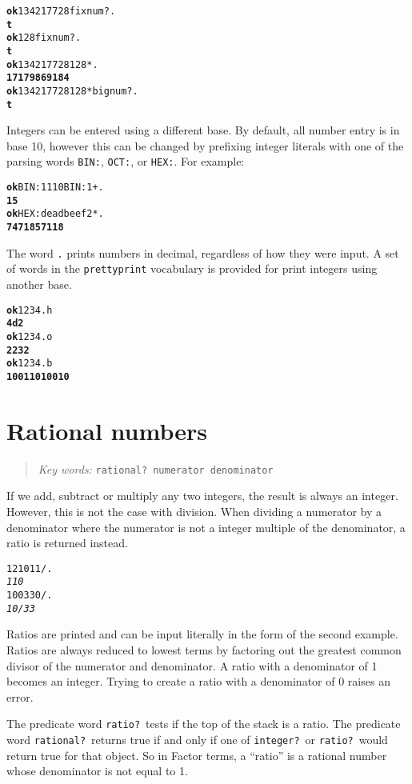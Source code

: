 \documentclass[english]{book}
\newcommand{\chapkeywords}[1]{%
\begin{quote}
\emph{Key words:} \texttt{#1}
\end{quote}
}
\begin{document}
\begin{alltt}
\textbf{ok} 134217728 fixnum? .
\textbf{t}
\textbf{ok} 128 fixnum? .
\textbf{t}
\textbf{ok} 134217728 128 * .
\textbf{17179869184}
\textbf{ok} 134217728 128 * bignum? .
\textbf{t}
\end{alltt}

Integers can be entered using a different base. By default, all number entry is in base 10, however this can be changed by prefixing integer literals with one of the parsing words \texttt{BIN:}, \texttt{OCT:}, or \texttt{HEX:}. For example:

\begin{alltt}
\textbf{ok} BIN: 1110 BIN: 1 + .
\textbf{15}
\textbf{ok} HEX: deadbeef 2 * .
\textbf{7471857118}
\end{alltt}

The word \texttt{.} prints numbers in decimal, regardless of how they were input. A set of words in the \texttt{prettyprint} vocabulary is provided for print integers using another base.

\begin{alltt}
\textbf{ok} 1234 .h
\textbf{4d2}
\textbf{ok} 1234 .o
\textbf{2232}
\textbf{ok} 1234 .b
\textbf{10011010010}
\end{alltt}

\section{Rational numbers}

\chapkeywords{rational?~numerator denominator}

If we add, subtract or multiply any two integers, the result is always an integer. However, this is not the case with division. When dividing a numerator by a denominator where the numerator is not a integer multiple of the denominator, a ratio is returned instead.

\begin{alltt}
1210 11 / .
\emph{110}
100 330 / .
\emph{10/33}
\end{alltt}

Ratios are printed and can be input literally in the form of the second example. Ratios are always reduced to lowest terms by factoring out the greatest common divisor of the numerator and denominator. A ratio with a denominator of 1 becomes an integer. Trying to create a ratio with a denominator of 0 raises an error.

The predicate word \texttt{ratio?}~tests if the top of the stack is a ratio. The predicate word \texttt{rational?}~returns true if and only if one of \texttt{integer?}~or \texttt{ratio?}~would return true for that object. So in Factor terms, a ``ratio'' is a rational number whose denominator is not equal to 1.
\end{document}
